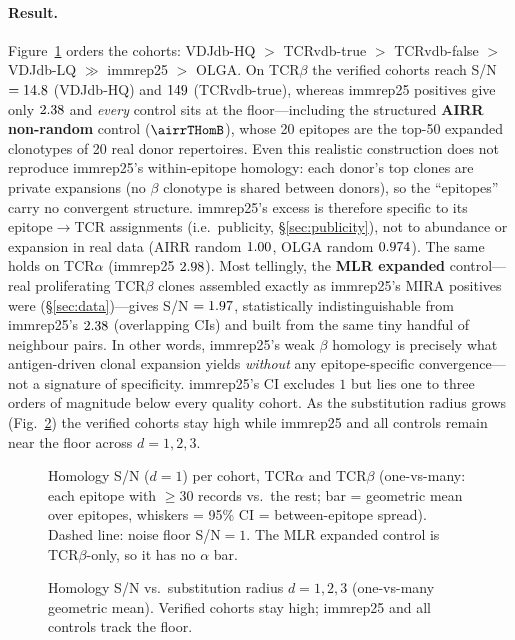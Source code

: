 \paragraph{Result.} Figure~\ref{fig:hom} orders the cohorts:
VDJdb-HQ $>$ TCRvdb-true $>$ TCRvdb-false $>$ VDJdb-LQ $\gg$ immrep25 $>$ OLGA.
On TCR$\beta$ the verified cohorts reach S/N $=14.8$ (VDJdb-HQ) and $149$
(TCRvdb-true), whereas immrep25 positives give only $2.38$ and \emph{every} control
sits at the floor---including the structured \textbf{AIRR non-random} control
($\airrTHomB$), whose 20 epitopes are the top-50 expanded clonotypes of 20 real donor
repertoires. Even this realistic construction does not reproduce immrep25's within-epitope
homology: each donor's top clones are private expansions (no $\beta$ clonotype is shared
between donors), so the ``epitopes'' carry no convergent structure. immrep25's excess is
therefore specific to its epitope$\to$TCR assignments (i.e.\ publicity,
\S\ref{sec:publicity}), not to abundance or expansion in real data
(AIRR random $1.00$, OLGA random $0.974$). The same holds on TCR$\alpha$
(immrep25 $2.98$). Most tellingly, the \textbf{MLR expanded} control---real
proliferating TCR$\beta$ clones assembled exactly as immrep25's MIRA positives were
(\S\ref{sec:data})---gives S/N $=1.97$, statistically indistinguishable from
immrep25's $2.38$ (overlapping CIs) and built from the same tiny handful of
neighbour pairs. In other words, immrep25's weak $\beta$ homology is precisely what
antigen-driven clonal expansion yields \emph{without} any epitope-specific
convergence---not a signature of specificity. immrep25's CI excludes $1$ but lies one to three orders of
magnitude below every quality cohort. As the substitution radius grows
(Fig.~\ref{fig:dlines}) the verified cohorts stay high while immrep25 and all controls
remain near the floor across $d=1,2,3$.

\begin{figure}[h]\centering

\caption{Homology S/N ($d{=}1$) per cohort, TCR$\alpha$ and TCR$\beta$ (one-vs-many:
each epitope with $\ge 30$ records vs.\ the rest; bar = geometric mean over epitopes,
whiskers = 95\% CI = between-epitope spread). Dashed line: noise floor S/N${=}1$. The
MLR expanded control is TCR$\beta$-only, so it has no $\alpha$ bar.}
\label{fig:hom}
\end{figure}

\begin{figure}[h]\centering

\caption{Homology S/N vs.\ substitution radius $d=1,2,3$ (one-vs-many geometric mean).
Verified cohorts stay high; immrep25 and all controls track the floor.}
\label{fig:dlines}
\end{figure}

